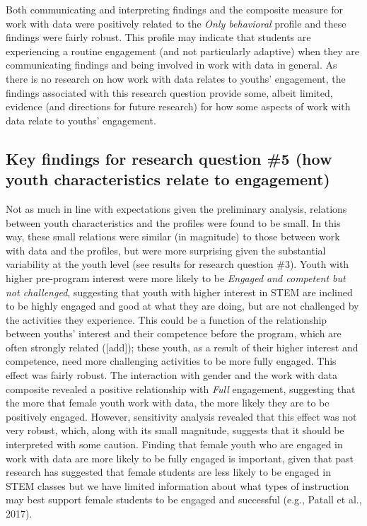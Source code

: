 \documentclass[]{book}
\theoremstyle{definition}
\theoremstyle{definition}
\theoremstyle{definition}
\theoremstyle{remark}
\begin{document}
Both communicating and interpreting findings and the composite measure
for work with data were positively related to the \emph{Only behavioral}
profile and these findings were fairly robust. This profile may indicate
that students are experiencing a routine engagement (and not
particularly adaptive) when they are communicating findings and being
involved in work with data in general. As there is no research on how
work with data relates to youths' engagement, the findings associated
with this research question provide some, albeit limited, evidence (and
directions for future research) for how some aspects of work with data
relate to youths' engagement.

\subsection{Key findings for research question \#5 (how youth
characteristics relate to
engagement)}\label{key-findings-for-research-question-5-how-youth-characteristics-relate-to-engagement}

Not as much in line with expectations given the preliminary analysis,
relations between youth characteristics and the profiles were found to
be small. In this way, these small relations were similar (in magnitude)
to those between work with data and the profiles, but were more
surprising given the substantial variability at the youth level (see
results for research question \#3). Youth with higher pre-program
interest were more likely to be \emph{Engaged and competent but not
challenged}, suggesting that youth with higher interest in STEM are
inclined to be highly engaged and good at what they are doing, but are
not challenged by the activities they experience. This could be a
function of the relationship between youths' interest and their
competence before the program, which are often strongly related
({[}add{]}); these youth, as a result of their higher interest and
competence, need more challenging activities to be more fully engaged.
This effect was fairly robust. The interaction with gender and the work
with data composite revealed a positive relationship with \emph{Full}
engagement, suggesting that the more that female youth work with data,
the more likely they are to be positively engaged. However, sensitivity
analysis revealed that this effect was not very robust, which, along
with its small magnitude, suggests that it should be interpreted with
some caution. Finding that female youth who are engaged in work with
data are more likely to be fully engaged is important, given that past
research has suggested that female students are less likely to be
engaged in STEM classes but we have limited information about what types
of instruction may best support female students to be engaged and
successful (e.g., Patall et al., 2017).
\end{document}
